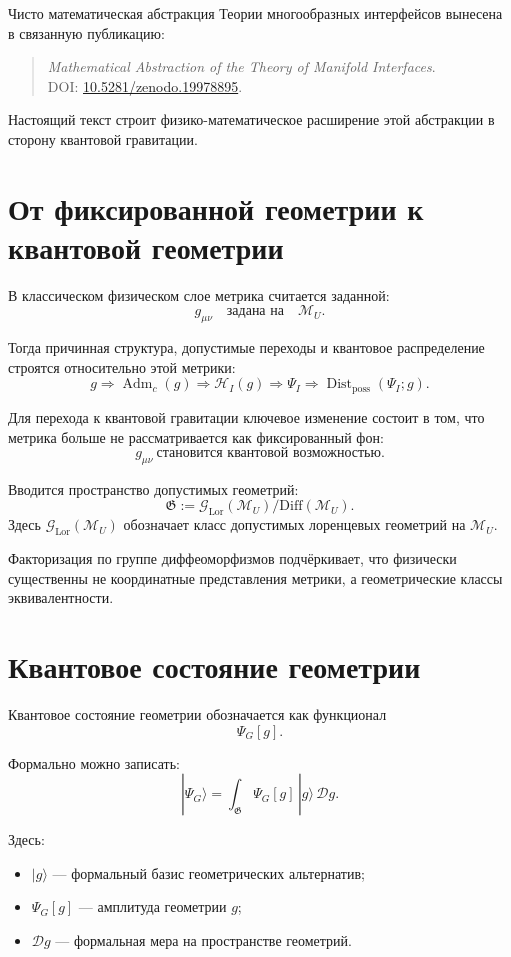 \documentclass[12pt,a4paper]{article}
\DeclareMathOperator{\Adm}{Adm}
\DeclareMathOperator{\Dist}{Dist}
\newcommand{\M}{\mathcal M_U}
\newcommand{\Gspace}{\mathfrak G}
\newcommand{\Hilb}{\mathcal H}
\newcommand{\D}{\mathcal D}
\begin{document}
Чисто математическая абстракция Теории многообразных интерфейсов вынесена в связанную публикацию:
\begin{quote}
\textit{Mathematical Abstraction of the Theory of Manifold Interfaces}.\\
DOI: \href{https://doi.org/10.5281/zenodo.19978895}{10.5281/zenodo.19978895}.
\end{quote}

Настоящий текст строит физико-математическое расширение этой абстракции в сторону квантовой гравитации.

\section{От фиксированной геометрии к квантовой геометрии}

В классическом физическом слое метрика считается заданной:
\[
g_{\mu\nu}\quad \text{задана на}\quad \M.
\]

Тогда причинная структура, допустимые переходы и квантовое распределение строятся относительно этой метрики:
\[
g
\Rightarrow
\Adm_c(g)
\Rightarrow
\Hilb_I(g)
\Rightarrow
\Psi_I
\Rightarrow
\Dist_{\mathrm{poss}}(\Psi_I;g).
\]

Для перехода к квантовой гравитации ключевое изменение состоит в том, что метрика больше не рассматривается как фиксированный фон:
\[
\boxed{g_{\mu\nu}\ \text{становится квантовой возможностью}.}
\]

Вводится пространство допустимых геометрий:
\[
\boxed{
\Gspace:=\mathcal G_{\mathrm{Lor}}(\M)/\mathrm{Diff}(\M).
}
\]
Здесь $\mathcal G_{\mathrm{Lor}}(\M)$ обозначает класс допустимых лоренцевых геометрий на $\M$.

Факторизация по группе диффеоморфизмов подчёркивает, что физически существенны не координатные представления метрики, а геометрические классы эквивалентности.

\section{Квантовое состояние геометрии}

Квантовое состояние геометрии обозначается как функционал
\[
\Psi_G[g].
\]

Формально можно записать:
\[
\boxed{
|\Psi_G\rangle
=
\int_{\Gspace}
\Psi_G[g]\,|g\rangle\,\D g.
}
\]

Здесь:
\begin{itemize}[leftmargin=2em]
    \item $|g\rangle$ --- формальный базис геометрических альтернатив;
    \item $\Psi_G[g]$ --- амплитуда геометрии $g$;
    \item $\D g$ --- формальная мера на пространстве геометрий.
\end{itemize}
\end{document}
